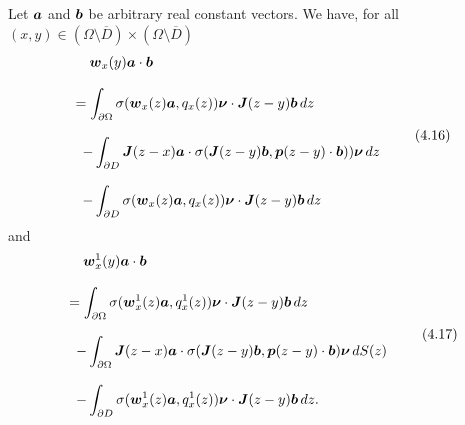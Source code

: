 Let $\mbox{\boldmath $a$}$ and $\mbox{\boldmath $b$}$ be arbitrary real constant vectors.
We have, for all $(x,y)\in(\Omega\setminus\overline{D})\times(\Omega\setminus\overline{D})$
$$\begin{array}{l}
\displaystyle
\,\,\,\,\,\,
\mbox{\boldmath $w$}_x(y)\mbox{\boldmath $a$}\cdot\mbox{\boldmath $b$}
\\
\\
\displaystyle
=\int_{\partial\Omega}\sigma(\mbox{\boldmath $w$}_x(z)\mbox{\boldmath $a$},q_x(z))\mbox{\boldmath $\nu$}\cdot
\mbox{\boldmath $J$}(z-y)\mbox{\boldmath $b$}\,dz
\\
\\
\displaystyle
\,\,\,
-
\int_{\partial D}
\mbox{\boldmath $J$}(z-x)\mbox{\boldmath $a$}\cdot
\sigma(\mbox{\boldmath $J$}(z-y)\mbox{\boldmath $b$},\mbox{\boldmath $p$}(z-y)\cdot\mbox{\boldmath $b$}))\mbox{\boldmath $\nu$}
\,dz\\
\\
\displaystyle
\,\,\,
-\int_{\partial D}
\sigma(\mbox{\boldmath $w$}_x(z)\mbox{\boldmath $a$},q_x(z))\mbox{\boldmath $\nu$}\cdot
\mbox{\boldmath $J$}(z-y)\mbox{\boldmath $b$}\,dz
\end{array}
\tag {4.16}
$$
and
$$\begin{array}{l}
\displaystyle
\,\,\,\,\,\,
\mbox{\boldmath $w$}_x^1(y)\mbox{\boldmath $a$}\cdot\mbox{\boldmath $b$}
\\
\\
\displaystyle
=\int_{\partial\Omega}\sigma(\mbox{\boldmath $w$}_x^1(z)\mbox{\boldmath $a$},q_x^1(z))\mbox{\boldmath $\nu$}\cdot
\mbox{\boldmath $J$}(z-y)\mbox{\boldmath $b$}\,dz\\
\\
\displaystyle
\,\,\,-\int_{\partial\Omega}\mbox{\boldmath $J$}(z-x)\mbox{\boldmath $a$}\cdot
\sigma(\mbox{\boldmath $J$}(z-y)\mbox{\boldmath $b$},\mbox{\boldmath $p$}(z-y)\cdot\mbox{\boldmath $b$})\mbox{\boldmath $\nu$}\,dS(z)
\\
\\
\displaystyle
\,\,\,
-\int_{\partial D}\sigma(\mbox{\boldmath $w$}_x^1(z)\mbox{\boldmath $a$},q_x^1(z))\mbox{\boldmath $\nu$}\cdot
\mbox{\boldmath $J$}(z-y)\mbox{\boldmath $b$}\,dz.
\end{array}
\tag {4.17}
$$




\endproclaim


